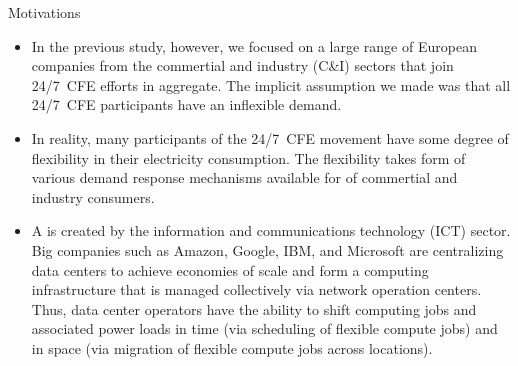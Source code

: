 \begin{frame}{Motivations}

  {\footnotesize
  \begin{itemize}
  \item In the previous study, however, we focused on a large range of European companies from the commertial and industry (C\&I) sectors that join 24/7~CFE efforts in aggregate. The implicit assumption we made was that all 24/7~CFE participants have an \alert{inflexible demand}.
  
  \item In reality, many participants of the 24/7~CFE movement have some degree of flexibility in their electricity consumption. The flexibility takes form of various demand response mechanisms available for  of commertial and industry consumers.

  \item  A  is created by the information and communications technology (ICT) sector. Big companies such as Amazon, Google, IBM, and Microsoft are centralizing data centers to achieve economies of scale and form a computing infrastructure that is managed collectively via network operation centers. Thus, data center operators have the ability to \alert{shift computing jobs and associated power loads} in time (via scheduling of flexible compute jobs) and in space (via migration of flexible compute jobs across locations). 
  \end{itemize}

  }

\end{frame}
  

